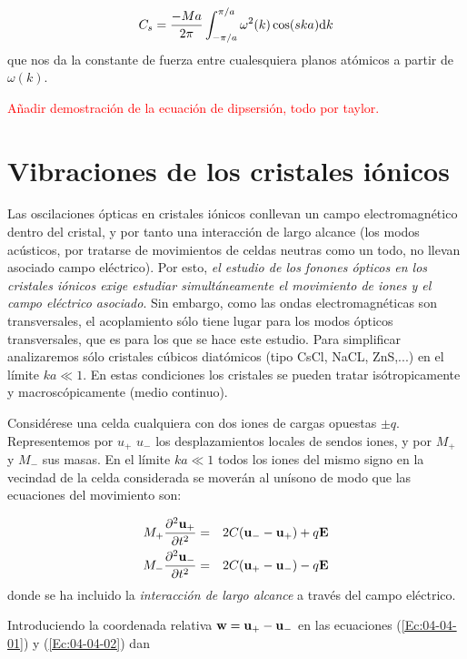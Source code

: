 \begin{equation}
    C_s = \frac{-Ma}{2\pi} \int_{-\pi/a}^{\pi/a} \omega^2 (k) \cos (ska) \mathrm{d} k
\end{equation}
que nos da la constante de fuerza entre cualesquiera planos atómicos a partir de $\omega (k)$.



\begin{Anotacion}
	\textcolor{red}{Añadir demostración de la ecuación de dipsersión, todo por taylor.}
\end{Anotacion}	

\section{Vibraciones de los cristales iónicos} \label{Sec:04-04}

Las oscilaciones ópticas en cristales iónicos conllevan un campo electromagnético dentro del cristal, y por tanto una interacción de largo alcance (los modos acústicos, por tratarse de movimientos de celdas neutras como un todo, no llevan asociado campo eléctrico). Por esto, \textit{el estudio de los fonones ópticos en los cristales iónicos exige estudiar simultáneamente el movimiento de iones y el campo eléctrico asociado}. Sin embargo, como las ondas electromagnéticas son transversales, el acoplamiento sólo tiene lugar para los modos ópticos transversales, que es para los que se hace este estudio. Para simplificar analizaremos sólo cristales cúbicos diatómicos (tipo CsCl, NaCL, ZnS,...) en el límite $ka\ll 1$. En estas condiciones los cristales se pueden tratar isótropicamente y macroscópicamente (medio continuo). 

Considérese una celda cualquiera con dos iones de cargas opuestas $\pm q$. Representemos por $u_+$ $u_-$ los desplazamientos locales de sendos iones, y por $M_+$ y $M_-$ sus masas. En el límite $ka\ll 1$ todos los iones del mismo signo en la vecindad de la celda considerada se moverán al unísono de modo que las ecuaciones del movimiento son:

\begin{eqnarray}
	M_+ \frac{\partial ^2 \mathbf{u}_+}{\partial t^2} & = & 2C(\mathbf{u}_- - \mathbf{u}_+) + q \mathbf{E} \label{Ec:04-04-01}\\
	M_- \frac{\partial ^2 \mathbf{u}_-}{\partial t^2} & = & 2C(\mathbf{u}_+ - \mathbf{u}_-) - q \mathbf{E} \label{Ec:04-04-02}
\end{eqnarray}
donde se ha incluido la \textit{interacción de largo alcance} a través del campo eléctrico. 

Introduciendo la coordenada relativa $\mathbf{w} = \mathbf{u}_+ - \mathbf{u}_-$ en las ecuaciones (\ref{Ec:04-04-01}) y (\ref{Ec:04-04-02}) dan


